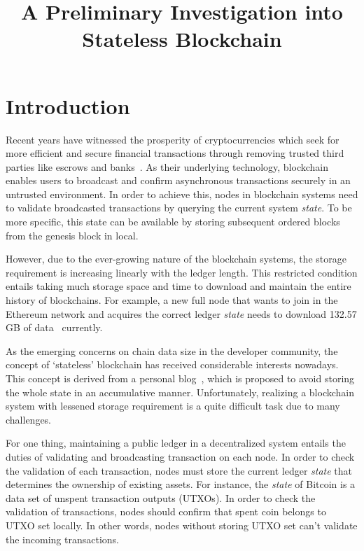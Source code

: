 \documentclass[conference]{IEEEtran}
\begin{document}
\title{A Preliminary Investigation into Stateless Blockchain}

\author{
}

\maketitle


\section{Introduction}
Recent years have witnessed the prosperity of cryptocurrencies which seek for more efficient and secure financial
transactions through removing trusted third parties like escrows and banks~\cite{SongWP00}.
%
As their underlying technology, blockchain enables users to broadcast and confirm asynchronous transactions securely in an untrusted environment.
%
In order to achieve this, nodes in blockchain systems need to validate broadcasted transactions by querying the current system \textit{state}.
%
To be more specific, this state can be available by storing subsequent ordered blocks from the genesis block in local.

However, due to the ever-growing nature of the blockchain systems, the storage requirement is increasing linearly with the ledger length.
%
This restricted condition entails taking much storage space and time to download and maintain the entire history of blockchains.
%
For example, a new full node that wants to join in the Ethereum network and acquires the correct ledger \textit{state} needs to download 132.57 GB of data~\cite{Ethereumstorage} currently. 

As the emerging concerns on chain data size in the developer community, the concept of `stateless' blockchain has received considerable interests nowadays.
%
This concept is derived from a personal blog~\cite{delayed-txo-commitments}, which is proposed to avoid storing the whole state in an accumulative manner.
%
Unfortunately, realizing a blockchain system with lessened storage requirement is a quite difficult task due to many challenges.

For one thing, maintaining a public ledger in a decentralized system entails the duties of validating and broadcasting transaction on each node.
%
In order to check the validation of each transaction, nodes must store the current ledger \textit{state} that determines the ownership of existing assets.
%
For instance, the \textit{state} of Bitcoin is a data set of unspent transaction outputs (UTXOs). 
%
In order to check the validation of transactions, nodes should confirm that spent coin belongs to UTXO set locally.
%
In other words, nodes without storing UTXO set can't validate the incoming transactions.
\end{document}
